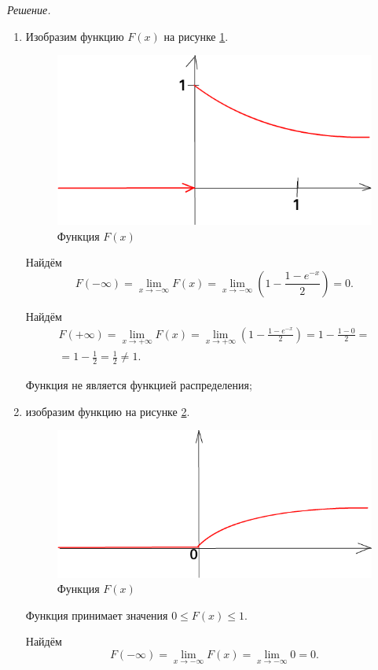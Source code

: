 \textit{Решение.}
\begin{enumerate}[label=\alph*)]
\item Изобразим функцию $F \left( x \right) $ на рисунке \ref{fig:918}.

\begin{figure}[h!]
  \centering
  \includegraphics[width=.4\textwidth]{./pictures/9_18.png}
  \caption{Функция $F \left( x \right) $}
  \label{fig:918}
\end{figure}

Найдём
$$F \left( - \infty \right) =
\lim \limits_{x \to - \infty } F \left( x \right) =
\lim \limits_{x \to - \infty } \left( 1 - \frac{1-e^{-x}}{2} \right) =
0.$$

Найдём
\begin{equation*}
\begin{split}
F \left( + \infty \right) =
\lim \limits_{x \to + \infty } F \left( x \right) =
\lim \limits_{x \to + \infty } \left( 1 - \frac{1-e^{-x}}{2} \right) =
1 - \frac{1-0}{2} = \\
= 1 - \frac{1}{2} =
\frac{1}{2} \neq
1.
\end{split}
\end{equation*}

Функция не является функцией распределения;
\item изобразим функцию на рисунке \ref{fig:9181}.

\begin{figure}[h!]
  \centering
  \includegraphics[width=.4\textwidth]{./pictures/9_18_1.png}
  \caption{Функция $F \left( x \right) $}
  \label{fig:9181}
\end{figure}

Функция принимает значения $0 \leq F \left( x \right) \leq 1$.

Найдём
$$F \left( - \infty \right) =
\lim \limits_{x \to - \infty } F \left( x \right) =
\lim \limits_{x \to - \infty} 0 =
0.$$


\end{enumerate}
